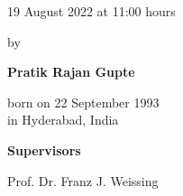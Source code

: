 \begin{titlepage}
\begin{addmargin}[-1cm]{-3cm}
\begin{center}
{            \vspace{3mm}

            19 August 2022 at 11:00 hours

            \vspace{12mm}

            by

            \vspace{12mm}

            \textbf{Pratik Rajan Gupte}

            \vspace{3mm}

            born on 22 September 1993\\
            in Hyderabad, India
        }









    \end{center}
  \end{addmargin}

\end{titlepage}

  \newpage


    \textbf{Supervisors}
    \begin{description}
        \item Prof. Dr. Franz J. Weissing
    \end{description}

